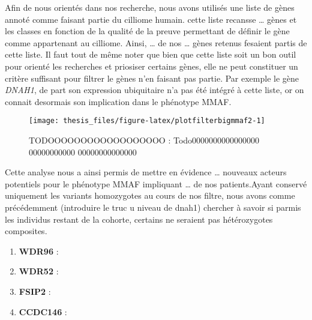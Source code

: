 \documentclass[12pt,twoside]{reedthesis}
\providecommand{\tightlist}{%
  \setlength{\itemsep}{0pt}\setlength{\parskip}{0pt}}
\theoremstyle{definition}
\theoremstyle{definition}
\theoremstyle{remark}
\begin{document}
  Afin de nous orientés dans nos recherche, nous avons utilisés une liste
  de gènes annoté comme faisant partie du cilliome humain. cette liste
  recansse \ldots{} gènes et les classes en fonction de la qualité de la
  preuve permettant de définir le gène comme appartenant au cilliome.
  Ainsi, \ldots{} de nos \ldots{} gènes retenus fesaient partis de cette
  liste. Il faut tout de même noter que bien que cette liste soit un bon
  outil pour orienté les recherches et priosiser certains gènes, elle ne
  peut constituer un critère suffisant pour filtrer le gènes n'en faisant
  pas partie. Par exemple le gène \emph{DNAH1}, de part son expression
  ubiquitaire n'a pas été intégré à cette liste, or on connait desormais
  son implication dans le phénotype MMAF.
  
  \begin{figure}
  
  {\centering \texttt{[image: thesis\_files/figure-latex/plotfilterbigmmaf2-1]} 
  
  }
  
  \caption[TODOOOOOOOOOOOOOOOOOO]{TODOOOOOOOOOOOOOOOOOO : Todo0000000000000000 00000000000 00000000000000}\label{fig:plotfilterbigmmaf2}
  \end{figure}
  
  \newpage
  
  Cette analyse nous a ainsi permis de mettre en évidence \ldots{}
  nouveaux acteurs potentiels pour le phénotype MMAF impliquant \ldots{}
  de nos patients.Ayant conservé uniquement les variants homozygotes au
  cours de nos filtre, nous avons comme précédemment (introduire le truc u
  niveau de dnah1) chercher à savoir si parmis les individus restant de la
  cohorte, certains ne seraient pas hétérozygotes composites.
  
  \begin{enumerate}
  \def\labelenumi{\arabic{enumi}.}
  \tightlist
  \item
    \textbf{WDR96} :
  \item
    \textbf{WDR52} :\\
  \item
    \textbf{FSIP2} :\\
  \item
    \textbf{CCDC146} :
  \end{enumerate}
  
\end{document}
